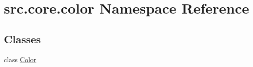 \hypertarget{namespacesrc_1_1core_1_1color}{}\section{src.\+core.\+color Namespace Reference}
\label{namespacesrc_1_1core_1_1color}
\subsection*{Classes}
\begin{DoxyCompactItemize}
\item 
class \hyperlink{classsrc_1_1core_1_1color_1_1Color}{Color}
\end{DoxyCompactItemize}
